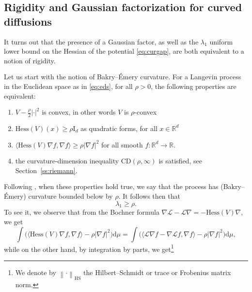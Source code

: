 \documentclass[10pt,reqno]{amsart}
\numberwithin{equation}{section}
\begin{document}
\subsection{Rigidity and Gaussian factorization for curved diffusions}
\label{ss:rigidity}

It turns out that the presence of a Gaussian factor, as well as the
$\lambda_1$ uniform lower bound on the Hessian of the potential
\eqref{eq:curgap}, are both equivalent to a notion of rigidity.

Let us start with the notion of Bakry--Émery curvature. For a Langevin
process in the Euclidean space as in \eqref{eq:eds}, for all $\rho>0$,
the following properties are equivalent:
\begin{enumerate}[label=(C\arabic*)]
\item $V-\frac{\rho}{2}\left|\cdot\right|^2$ is convex, in other words $V$ is $\rho$-convex 
\item $\mathrm{Hess}(V)(x)\geq\rho\mathrm{I}_d$ as quadratic forms, for all
  $x\in\mathbb{R}^d$
\item $\langle\mathrm{Hess}(V)\nabla f,\nabla f\rangle\geq\rho|\nabla f|^2$
  for all smooth $f:\mathbb{R}^d\to\mathbb{R}$.
\item the curvature-dimension inequality
$\mathrm{CD}(\rho,\infty)$ is satisfied, see Section~\ref{ss:riemann}.
\end{enumerate}
Following \cite{BGL14}, when these properties hold true, we say that the process has (Bakry--Émery) curvature bounded
below by $\rho$. It follows then that
\begin{equation}\label{eq:Lichne}
  \lambda_1\geq\rho.
\end{equation}
To see it, we observe that from the Bochner formula
$\nabla\mathcal{L}-\mathcal{L}\nabla=-\mathrm{Hess}(V)\nabla$, we get
\begin{equation}
  \int\bigl(\langle\mathrm{Hess}(V)\nabla f,\nabla f\rangle-\rho|\nabla f|^2\bigr)\mathrm{d}\mu
  =\int\bigl(\langle\mathcal{L}\nabla f-\nabla\mathcal{L} f,\nabla f\rangle-\rho|\nabla f|^2\bigr)\mathrm{d}\mu,
\end{equation}
while on the other hand, by integration by parts, we get\footnote{We denote by $\left\|\cdot\right\|_{\mathrm{HS}}$ the Hilbert--Schmidt or
trace or Frobenius matrix norm.}
\end{document}
